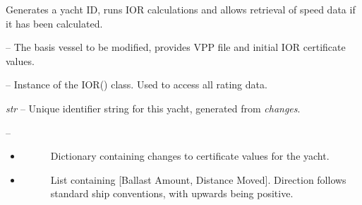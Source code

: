 \documentclass[letterpaper,10pt,english]{sphinxmanual}
\begin{document}
\begin{fulllineitems}
\label{index:IORAnalysis.Yacht}
Generates a yacht ID, runs IOR calculations and
allows retrieval of speed data if it has been calculated.

\begin{fulllineitems}
\label{index:IORAnalysis.Yacht.BaseYacht}
 -- The basis vessel to be modified, provides VPP file and
initial IOR certificate values.

\end{fulllineitems}


\begin{fulllineitems}
\label{index:IORAnalysis.Yacht.IOR}
 -- Instance of the IOR() class. Used to access all rating data.

\end{fulllineitems}


\begin{fulllineitems}
\label{index:IORAnalysis.Yacht.ID}
\emph{str} -- Unique identifier string for this yacht, generated from \emph{changes}.

\end{fulllineitems}


\begin{fulllineitems}
\label{index:IORAnalysis.Yacht.changes}
 --
\begin{itemize}
\item {} \begin{description}
\item[{}] \leavevmode
Dictionary containing changes to certificate values for
the yacht.

\end{description}

\item {} \begin{description}
\item[{}] \leavevmode
List containing {[}Ballast Amount, Distance  Moved{]}.
Direction follows standard ship conventions, with
upwards being positive.


\end{description}
\end{itemize}
\end{fulllineitems}
\end{fulllineitems}
\end{document}
